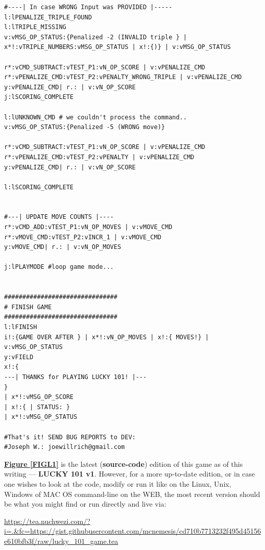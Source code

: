 \documentclass[a4paper, 18pt]{book} %
\begin{document}
{\begin{tcolorbox}[teaterminalstyle, title=TEA Program: LUCKY 101 v1, breakable]
\begin{lstlisting}[language=TEA,breaklines=true,]
#----| In case WRONG Input was PROVIDED |-----
l:lPENALIZE_TRIPLE_FOUND
l:lTRIPLE_MISSING
v:vMSG_OP_STATUS:{Penalized -2 (INVALID triple } | x*!:vTRIPLE_NUMBERS:vMSG_OP_STATUS | x!:{)} | v:vMSG_OP_STATUS

r*:vCMD_SUBTRACT:vTEST_P1:vN_OP_SCORE | v:vPENALIZE_CMD
r*:vPENALIZE_CMD:vTEST_P2:vPENALTY_WRONG_TRIPLE | v:vPENALIZE_CMD
y:vPENALIZE_CMD| r.: | v:vN_OP_SCORE 
j:lSCORING_COMPLETE

l:lUNKNOWN_CMD # we couldn't process the command..
v:vMSG_OP_STATUS:{Penalized -5 (WRONG move)}

r*:vCMD_SUBTRACT:vTEST_P1:vN_OP_SCORE | v:vPENALIZE_CMD
r*:vPENALIZE_CMD:vTEST_P2:vPENALTY | v:vPENALIZE_CMD
y:vPENALIZE_CMD| r.: | v:vN_OP_SCORE 

l:lSCORING_COMPLETE


#---| UPDATE MOVE COUNTS |----
r*:vCMD_ADD:vTEST_P1:vN_OP_MOVES | v:vMOVE_CMD
r*:vMOVE_CMD:vTEST_P2:vINCR_1 | v:vMOVE_CMD
y:vMOVE_CMD| r.: | v:vN_OP_MOVES

j:lPLAYMODE #loop game mode...


###############################
# FINISH GAME
###############################
l:lFINISH
i!:{GAME OVER AFTER } | x*!:vN_OP_MOVES | x!:{ MOVES!} | v:vMSG_OP_STATUS
y:vFIELD
x!:{
---| THANKS for PLAYING LUCKY 101! |---
}
| x*!:vMSG_OP_SCORE 
| x!:{ | STATUS: }
| x*!:vMSG_OP_STATUS 

#That's it! SEND BUG REPORTS to DEV:
#Joseph W.: joewillrich@gmail.com
   \end{lstlisting}
  \end{tcolorbox}
  \label{FIGL1}
  \vspace{1cm}


}
 \raggedright %
  
 
 \textbf{\hyperref[FIGL1]{Figure \ref{FIGL1}}} is the latest (\textbf{source-code}) edition of this game as of this writing --- \textbf{LUCKY 101 v1}. However, for a more up-to-date edition, or in case one wishes to look at the code, modify or run it like on the Linux, Unix, Windows of MAC OS command-line on the WEB, the most recent version should be what you might find or run directly and live via:
  
  
\vspace{1em}

 \url{https://tea.nuchwezi.com/?i=.&fc=https://gist.githubusercontent.com/mcnemesis/cd710b7713232f495d45156e610bfb3f/raw/lucky_101_game.tea}
\end{document}
